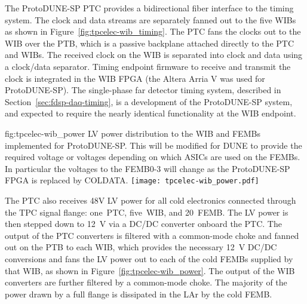The ProtoDUNE-SP PTC provides a bidirectional fiber interface to the
timing system. The clock and data
streams are separately fanned out to the five WIBs as shown in
Figure~\ref{fig:tpcelec-wib_timing}. The PTC fans the clocks out to the WIB over the
PTB, which is a passive backplane attached directly to the PTC and
WIBs.  The received clock on the WIB is separated into clock and
data using a clock/data separator. Timing endpoint firmware to receive and transmit
the clock is integrated in the WIB FPGA (the Altera Arria V was used for ProtoDUNE-SP).
The single-phase far detector timing system, described in Section~\ref{sec:fdsp-daq-timing}, is a development of the ProtoDUNE-SP system, and expected to require the nearly identical functionality at the WIB endpoint.

\begin{dunefigure}
{fig:tpcelec-wib_power}
{LV power distribution to the WIB and FEMBs implemented for ProtoDUNE-SP. This will be modified for DUNE to provide the required voltage or voltages depending on which ASICs are used on the FEMBs. In particular the voltages to the FEMB0-3 will change as the ProtoDUNE-SP FPGA is replaced by COLDATA. }
\texttt{[image: tpcelec-wib\_power.pdf]}
\end{dunefigure}

The PTC also receives 48V LV power for all cold
electronics connected through the TPC signal flange: one~PTC, five~WIB, and 20~FEMB. The LV power is then stepped down
to 12~V via a DC/DC converter onboard the PTC. The output of the PTC converters is filtered with a common-mode choke and fanned out
on the PTB to each WIB, which provides the necessary 12~V DC/DC conversions and fans
the LV power out to each of the cold FEMBs supplied by that WIB, 
as shown in Figure~\ref{fig:tpcelec-wib_power}. The output of the WIB converters are further filtered by a common-mode choke. The 
majority of the power drawn by a full flange is dissipated in the LAr by the cold FEMB.


